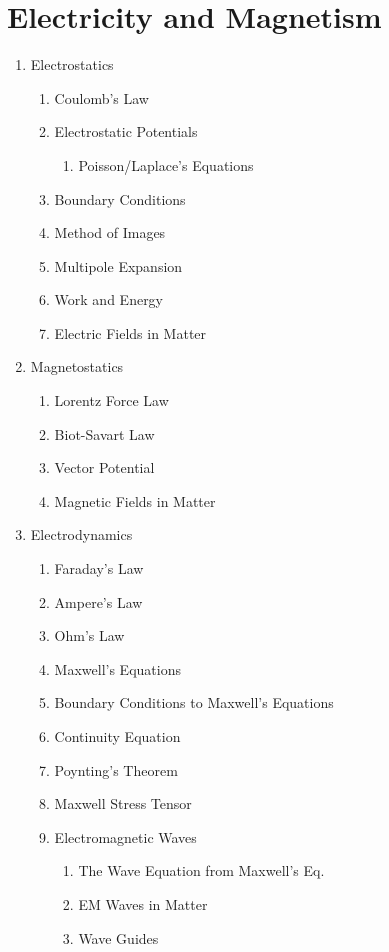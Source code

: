 \documentclass[12pt]{extarticle}
\begin{document}
\section{Electricity and Magnetism}
\begin{enumerate}
  \item{Electrostatics}
  \begin{enumerate}
    \item{Coulomb's Law}
    \item{Electrostatic Potentials}
    \begin{enumerate}
      \item{Poisson/Laplace's Equations}
    \end{enumerate}
    \item{Boundary Conditions}
    \item{Method of Images}
    \item{Multipole Expansion}
    \item{Work and Energy}
    \item{Electric Fields in Matter}
  \end{enumerate}
  \item{Magnetostatics}
  \begin{enumerate}
    \item{Lorentz Force Law}
    \item{Biot-Savart Law}
    \item{Vector Potential}
    \item{Magnetic Fields in Matter}
  \end{enumerate}
  \item{Electrodynamics}
  \begin{enumerate}
    \item{Faraday's Law}
    \item{Ampere's Law}
    \item{Ohm's Law}
    \item{Maxwell's Equations}
    \item{Boundary Conditions to Maxwell's Equations}
    \item{Continuity Equation}
    \item{Poynting's Theorem}
    \item{Maxwell Stress Tensor}
    \item{Electromagnetic Waves}
    \begin{enumerate}
      \item{The Wave Equation from Maxwell's Eq.}
      \item{EM Waves in Matter}
      \item{Wave Guides}

\end{enumerate}
\end{enumerate}
\end{enumerate}
\end{document}
